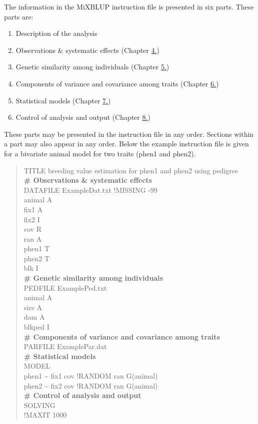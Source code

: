 The information in the MiXBLUP instruction file is presented in six
parts. These parts are:

\begin{enumerate}
\def\labelenumi{\arabic{enumi}.}
\tightlist
\item
  Description of the analysis\\
\item
  Observations \& systematic effects (Chapter \hyperref[Obse01]{4.})\\
\item
  Genetic similarity among individuals (Chapter \hyperref[Gene01]{5.})\\
\item
  Components of variance and covariance among traits (Chapter
  \hyperref[Comp01]{6.})\\
\item
  Statistical models (Chapter \hyperref[Stat01]{7.})\\
\item
  Control of analysis and output (Chapter \hyperref[Cont01]{8.})
\end{enumerate}

These parts may be presented in the instruction file in any order.
Sections within a part may also appear in any order. Below the example
instruction file is given for a bivariate animal model for two traits
(phen1 and phen2).

\begin{quote}
TITLE breeding value estimation for phen1 and phen2 using pedigree\\
\textbf{\# Observations \& systematic effects}\\
DATAFILE ExampleDat.txt !MISSING -99\\
animal A\\
fix1 A\\
fix2 I\\
cov R\\
ran A\\
phen1 T\\
phen2 T\\
blk I\\
\textbf{\# Genetic similarity among individuals}\\
PEDFILE ExamplePed.txt\\
animal A\\
sire A\\
dam A\\
blkped I\\
\textbf{\# Components of variance and covariance among traits}\\
PARFILE ExamplePar.dat\\
\textbf{\# Statistical models}\\
MODEL\\
phen1 \textasciitilde{} fix1 cov !RANDOM ran G(animal)\\
phen2 \textasciitilde{} fix2 cov !RANDOM ran G(animal)\\
\textbf{\# Control of analysis and output}\\
SOLVING\\
!MAXIT 1000\\
\end{quote}

